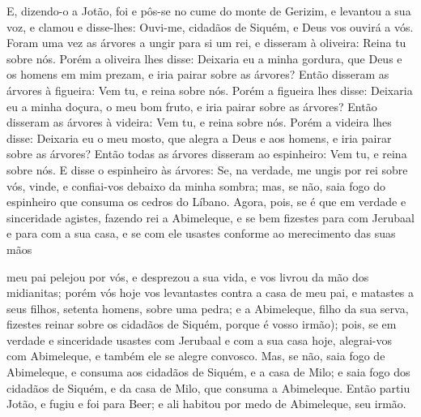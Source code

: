 E, dizendo-o a Jotão, foi e pôs-se no cume do monte de Gerizim, e
levantou a sua voz, e clamou e disse-lhes: Ouvi-me, cidadãos de
Siquém, e Deus vos ouvirá a vós. Foram uma vez as árvores a
ungir para si um rei, e disseram à oliveira: Reina tu sobre nós.
Porém a oliveira lhes disse: Deixaria eu a minha gordura, que
Deus e os homens em mim prezam, e iria pairar sobre as árvores?
Então disseram as árvores à figueira: Vem tu, e reina sobre
nós. Porém a figueira lhes disse: Deixaria eu a minha doçura,
o meu bom fruto, e iria pairar sobre as árvores? Então
disseram as árvores à videira: Vem tu, e reina sobre nós.
Porém a videira lhes disse: Deixaria eu o meu mosto, que
alegra a Deus e aos homens, e iria pairar sobre as árvores?
Então todas as árvores disseram ao espinheiro: Vem tu, e
reina sobre nós. E disse o espinheiro às árvores: Se, na
verdade, me ungis por rei sobre vós, vinde, e confiai-vos debaixo da
minha sombra; mas, se não, saia fogo do espinheiro que consuma os
cedros do Líbano. Agora, pois, se é que em verdade e
sinceridade agistes, fazendo rei a Abimeleque, e se bem fizestes
para com Jerubaal e para com a sua casa, e se com ele usastes
conforme ao merecimento das suas mãos

meu pai pelejou por vós, e desprezou a sua vida, e vos
livrou da mão dos midianitas; porém vós hoje vos levantastes
contra a casa de meu pai, e matastes a seus filhos, setenta homens,
sobre uma pedra; e a Abimeleque, filho da sua serva, fizestes reinar
sobre os cidadãos de Siquém, porque é vosso irmão); pois, se
em verdade e sinceridade usastes com Jerubaal e com a sua casa hoje,
alegrai-vos com Abimeleque, e também ele se alegre convosco.
Mas, se não, saia fogo de Abimeleque, e consuma aos cidadãos
de Siquém, e a casa de Milo; e saia fogo dos cidadãos de Siquém, e
da casa de Milo, que consuma a Abimeleque. Então partiu
Jotão, e fugiu e foi para Beer; e ali habitou por medo de
Abimeleque, seu irmão.

